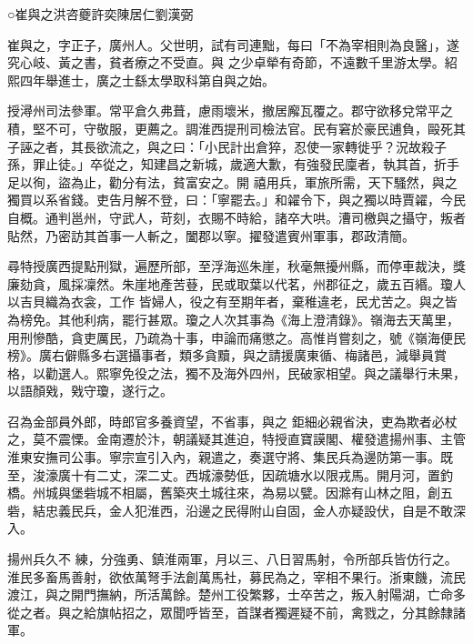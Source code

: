 
\begin{pinyinscope}

 ○崔與之洪咨夔許奕陳居仁劉漢弼



 崔與之，字正子，廣州人。父世明，試有司連黜，每曰「不為宰相則為良醫」，遂究心岐、黃之書，貧者療之不受直。與
 之少卓犖有奇節，不遠數千里游太學。紹熙四年舉進士，廣之士繇太學取科第自與之始。



 授潯州司法參軍。常平倉久弗葺，慮雨壞米，撤居廨瓦覆之。郡守欲移兌常平之積，堅不可，守敬服，更薦之。調淮西提刑司檢法官。民有窘於豪民逋負，毆死其子誣之者，其長欲流之，與之曰：「小民計出倉猝，忍使一家轉徙乎？況故殺子孫，罪止徒。」卒從之，知建昌之新城，歲適大歉，有強發民廩者，執其首，折手足以徇，盜為止，勸分有法，貧富安之。開
 禧用兵，軍旅所需，天下騷然，與之獨買以系省錢。吏告月解不登，曰：「寧罷去。」和糴令下，與之獨以時賈糴，今民自概。通判邕州，守武人，苛刻，衣賜不時給，諸卒大哄。漕司檄與之攝守，叛者貼然，乃密訪其首事一人斬之，闔郡以寧。擢發遣賓州軍事，郡政清簡。



 尋特授廣西提點刑獄，遍歷所部，至浮海巡朱崖，秋毫無擾州縣，而停車裁決，獎廉劾貪，風採凜然。朱崖地產苦䔲，民或取葉以代茗，州郡征之，歲五百緡。瓊人以吉貝織為衣衾，工作
 皆婦人，役之有至期年者，棄稚違老，民尤苦之。與之皆為榜免。其他利病，罷行甚眾。瓊之人次其事為《海上澄清錄》。嶺海去天萬里，用刑慘酷，貪吏厲民，乃疏為十事，申論而痛懲之。高惟肖嘗刻之，號《嶺海便民榜》。廣右僻縣多右選攝事者，類多貪黷，與之請援廣東循、梅諸邑，減舉員賞格，以勸選人。熙寧免役之法，獨不及海外四州，民破家相望。與之議舉行未果，以語顏戣，戣守瓊，遂行之。



 召為金部員外郎，時郎官多養資望，不省事，與之
 鉅細必親省決，吏為欺者必杖之，莫不震慄。金南遷於汴，朝議疑其進迫，特授直寶謨閣、權發遣揚州事、主管淮東安撫司公事。寧宗宣引入內，親遣之，奏選守將、集民兵為邊防第一事。既至，浚濠廣十有二丈，深二丈。西城濠勢低，因疏塘水以限戎馬。開月河，置釣橋。州城與堡砦城不相屬，舊築夾土城往來，為易以甓。因滁有山林之阻，創五砦，結忠義民兵，金人犯淮西，沿邊之民得附山自固，金人亦疑設伏，自是不敢深入。



 揚州兵久不
 練，分強勇、鎮淮兩軍，月以三、八日習馬射，令所部兵皆仿行之。淮民多畜馬善射，欲依萬弩手法創萬馬社，募民為之，宰相不果行。浙東饑，流民渡江，與之開門撫納，所活萬餘。楚州工役繁夥，士卒苦之，叛入射陽湖，亡命多從之者。與之給旗帖招之，眾聞呼皆至，首謀者獨遲疑不前，禽戮之，分其餘隸諸軍。




\end{pinyinscope}
